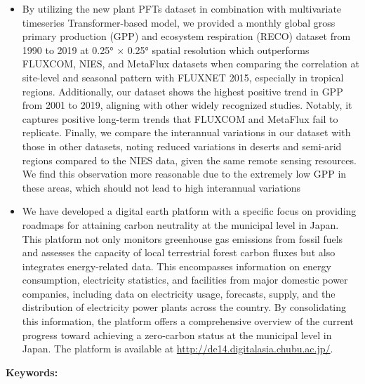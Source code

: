 \begin{itemize}
    \item By utilizing the new plant PFTs dataset in combination with multivariate timeseries Transformer-based model, we provided a monthly global gross primary production (GPP) and ecosystem respiration (RECO) dataset from 1990 to 2019 at 0.25° × 0.25° spatial resolution which outperforms FLUXCOM, NIES, and MetaFlux datasets when comparing the correlation at site-level and seasonal pattern with FLUXNET 2015, especially in tropical regions. Additionally, our dataset shows the highest positive trend in GPP from 2001 to 2019, aligning with other widely recognized studies. Notably, it captures positive long-term trends that FLUXCOM and MetaFlux fail to replicate. Finally, we compare the interannual variations in our dataset with those in other datasets, noting reduced variations in deserts and semi-arid regions compared to the NIES data, given the same remote sensing resources. We find this observation more reasonable due to the extremely low GPP in these areas, which should not lead to high interannual variations 
    \item We have developed a digital earth platform with a specific focus on providing roadmaps for attaining carbon neutrality at the municipal level in Japan. This platform not only monitors greenhouse gas emissions from fossil fuels and assesses the capacity of local terrestrial forest carbon fluxes but also integrates energy-related data. This encompasses information on energy consumption, electricity statistics, and facilities from major domestic power companies, including data on electricity usage, forecasts, supply, and the distribution of electricity power plants across the country. By consolidating this information, the platform offers a comprehensive overview of the current progress toward achieving a zero-carbon status at the municipal level in Japan. The platform is available at \url{http://de14.digitalasia.chubu.ac.jp/}.
\end{itemize}

\vspace*{5truemm}
\begin{flushleft}
 {\bfseries Keywords:}
\end{flushleft}\ekeywords
